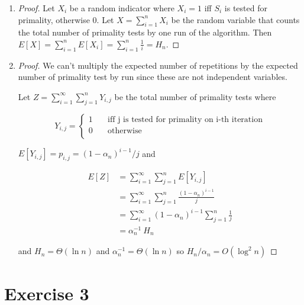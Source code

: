 \documentclass[12pt, a4paper]{article} %
\begin{document}
\begin{enumerate}[label=(\alph*)]
\item\label{item:2d} \begin{proof} Let $X_i$ be a random indicator where $X_i = 1$ iff $S_i$ is tested for primality, otherwise $0$. Let $X = \sum_{i = 1}^n X_i$ be the random variable that counts the total number of primality tests by one run of the algorithm. Then $E[X] = \sum_{i = 1}^n E[X_i] = \sum_{i=1}^n \frac{1}{i} = H_n$.

  \end{proof}

  \item\label{item:2e} \begin{proof} We can't multiply the expected number of repetitions by the expected number of primality test by run since these are not independent variables.

      Let $Z = \sum_{i = 1}^{\infty} \sum_{j = 1}^{n} Y_{i,j}$ be the total number of primality tests where

      \begin{equation*}
        Y_{i,j} = \begin{cases}
          1  \quad& \text{iff j is tested for primality on i-th iteration} \\
          0  & \text{otherwise} \\
        \end{cases}
      \end{equation*}

    $E[Y_{i,j}] = p_{i,j} = (1 - \alpha_n)^{i-1}/j$ and

    \begin{align*}
      E[Z] &= \sum_{i = 1}^{\infty} \sum_{j = 1}^{n} E[Y_{i,j}] \\
           &= \sum_{i = 1}^{\infty} \sum_{j = 1}^{n} \frac{(1 - \alpha_n)^{i-1}}{j} \\
           &= \sum_{i = 1}^{\infty} (1 - \alpha_n)^{i-1} \sum_{j = 1}^{n} \frac{1}{j} \\
           &= \alpha_n^{-1} \ H_n
    \end{align*}

    and $H_n = \Theta(\ln n)$ and $\alpha_n^{-1} = \Theta(\ln n)$ so $H_n / \alpha_n = O(\log^2 n)$

  \end{proof}
\end{enumerate}


\section*{Exercise 3}
\label{sec:3}
\end{document}
